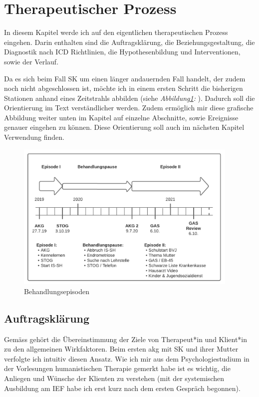 \section{Therapeutischer Prozess}\label{Prozess}
In diesem Kapitel werde ich auf den eigentlichen therapeutischen Prozess eingehen. Darin enthalten sind die Auftragsklärung, die Beziehungsgestaltung, die Diagnostik nach ICD Richtlinien, die Hypothesenbildung und Interventionen, sowie der Verlauf.   

Da es sich beim Fall SK um einen länger andauernden Fall handelt, der zudem noch nicht abgeschlossen ist, möchte ich in einem ersten Schritt die bisherigen Stationen anhand eines Zeitstrahls abbilden (siehe \textit{Abbildung\ref{fig:Behanldungsepisode}: }). Dadurch soll die Orientierung im Text verständlicher werden. Zudem ermöglich mir diese grafische Abbildung weiter unten im Kapitel \textit{} auf einzelne Abschnitte, sowie Ereignisse genauer eingehen zu können. Diese Orientierung soll auch im nächsten Kapitel \textit{} Verwendung finden. 

\begin{figure} 
    \includegraphics[width=0.95\textwidth]{pictures/Zeitstrahl_Fall_SK.png}
    \caption{Behandlungsepisoden}
    \label{fig:Behanldungsepisode}
\end{figure}

\subsection{Auftragsklärung}\label{Auftragsklärung} 
Gemäss  gehört die Übereinstimmung der Ziele von Therapeut*in und Klient*in zu den allgemeinen Wirkfaktoren. Beim ersten \acf{akg} mit SK und ihrer Mutter verfolgte ich intuitiv diesen Ansatz. Wie ich mir aus dem Psychologiestudium in der Vorlesungen humanistischen Therapie gemerkt habe ist es wichtig, die Anliegen und Wünsche der Klienten zu verstehen (mit der systemischen Ausbildung am IEF habe ich erst kurz nach dem ersten Gespräch begonnen). 

